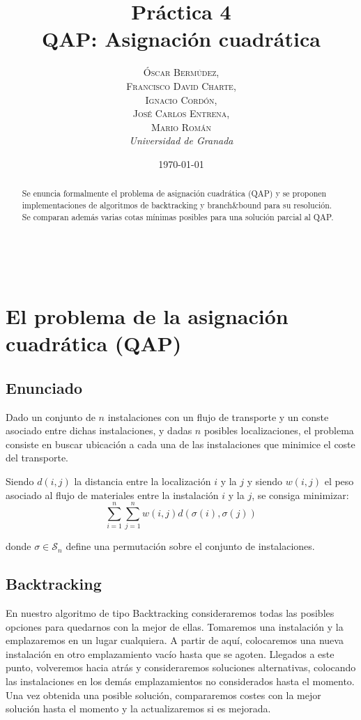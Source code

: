 \documentclass[a4paper, 11pt]{article} %
\title{\textbf{Práctica 4}\\ %
QAP: Asignación cuadrática} %
\author{\textsc{Óscar Bermúdez,\\Francisco David Charte,\\Ignacio Cordón,\\José Carlos Entrena,\\Mario Román} %
\\{\textit{Universidad de Granada}}} %
\date{\today} %
\makeatletter
\renewcommand{\maketitle}{ %
\begin{flushright} %
{\LARGE\@title} %

\vspace{50pt} %

{\large\@author} %
\\\@date %

\vspace{40pt} %
\end{flushright}
}
\makeatother
\begin{document}
\maketitle %

\renewcommand{\abstractname}{Resumen} %
\begin{abstract}
  Se enuncia formalmente el problema de asignación cuadrática (QAP) y se proponen implementaciones
  de algoritmos de backtracking y branch\&bound para su resolución. Se comparan además varias cotas
  mínimas posibles para una solución parcial al QAP.
\end{abstract}
{\parskip=2pt
\tableofcontents
}
\pagebreak

  \section{El problema de la asignación cuadrática (QAP)}
    \subsection{Enunciado}
      Dado un conjunto de $n$ instalaciones con un flujo de transporte y
      un conste asociado entre dichas instalaciones, y dadas $n$ posibles localizaciones,
      el problema consiste en buscar ubicación a cada una de las instalaciones que
      minimice el coste del transporte.
      
      Siendo $d(i,j)$ la distancia entre la localización $i$ y la $j$
      y siendo $w(i,j)$ el peso asociado al flujo de materiales entre la instalación
      $i$ y la $j$, se consiga minimizar:
      \begin{equation}
      \sum_{i=1}^n \sum_{j=1}^nw(i,j) d(\sigma(i),\sigma(j))
      \label{coste}
      \end{equation}

      donde $\sigma \in \mathcal{S}_n$ define una permutación sobre el conjunto de instalaciones.


    \subsection{Backtracking}
      En nuestro algoritmo de tipo Backtracking consideraremos todas las posibles opciones para quedarnos con la mejor de ellas.
      Tomaremos una instalación y la emplazaremos en un lugar cualquiera. A partir de aquí, colocaremos una nueva instalación
      en otro emplazamiento vacío hasta que se agoten. Llegados a este punto, volveremos hacia atrás y consideraremos soluciones
      alternativas, colocando las instalaciones en los demás emplazamientos no considerados hasta el momento. Una vez obtenida una
      posible solución, compararemos costes con la mejor solución hasta el momento y la actualizaremos si es mejorada.       
      
\end{document}
